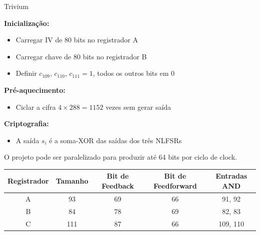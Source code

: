 \documentclass{beamer}
\begin{document}

\begin{frame}{Trivium}

\textbf{Inicialização:}
\begin{itemize}
    \item Carregar IV de 80 bits no registrador A
    \item Carregar chave de 80 bits no registrador B
    \item Definir $c_{109}$, $c_{110}$, $c_{111} = 1$, todos os outros bits em 0
\end{itemize}

\textbf{Pré-aquecimento:}
\begin{itemize}
    \item Ciclar a cifra $4 \times 288 = 1152$ vezes sem gerar saída
\end{itemize}

\textbf{Criptografia:}
\begin{itemize}
    \item A saída $s_i$ é a soma-XOR das saídas dos três NLFSRs
\end{itemize}

\vspace{0.5em}
\small O projeto pode ser paralelizado para produzir até 64 bits por ciclo de clock.

\vspace{1em}

\begin{table}[]
\scriptsize
\centering
{}
\begin{tabular}{|c|c|c|c|c|}
\hline
\rowcolor{red!20}
\textbf{Registrador} & \textbf{Tamanho} & \textbf{Bit de Feedback} & \textbf{Bit de Feedforward} & \textbf{Entradas AND} \\
\hline
A & 93  & 69 & 66 & 91, 92 \\
B & 84  & 78 & 69 & 82, 83 \\
C & 111 & 87 & 66 & 109, 110 \\
\hline
\end{tabular}
\end{table}

\end{frame}

\end{document}
